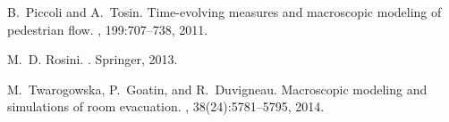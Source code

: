\documentclass{cmslatex}
\begin{document}
\begin{thebibliography}{}
B.~Piccoli and A.~Tosin. 
\newblock Time-evolving measures and macroscopic modeling of pedestrian flow.
, 199:707--738, 2011.

M.~D. Rosini.
.
\newblock Springer, 2013.

M.~Twarogowska, P.~Goatin, and R.~Duvigneau.
\newblock Macroscopic modeling and simulations of room evacuation.
, 38(24):5781--5795, 2014.

\end{thebibliography}
\end{document}
